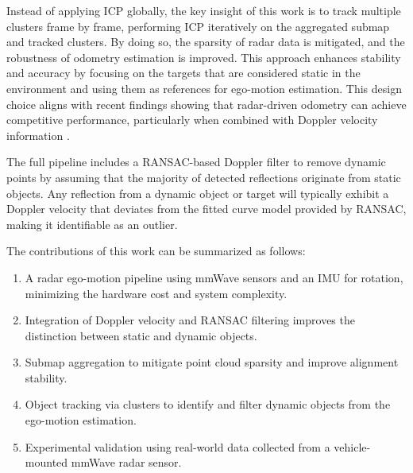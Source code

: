 Instead of applying ICP globally, the key insight of this work is to track multiple clusters frame by frame, performing ICP iteratively on the aggregated submap and tracked clusters.
By doing so, the sparsity of radar data is mitigated, and the robustness of odometry estimation is improved.
This approach enhances stability and accuracy by focusing on the targets that are considered static in the environment and using them as references for ego-motion estimation.
This design choice aligns with recent findings showing that radar-driven odometry can achieve competitive performance, particularly when combined with Doppler velocity information \cite{EgoMotion_DopplerRadar, HighSpeed_Estimation}.

The full pipeline includes a RANSAC-based Doppler filter to remove dynamic points by assuming that the majority of detected reflections originate from static objects.
Any reflection from a dynamic object or target will typically exhibit a Doppler velocity that deviates from the fitted curve model provided by RANSAC, making it identifiable as an outlier.

The contributions of this work can be summarized as follows:  
\begin{enumerate}
    \item A radar ego-motion pipeline using mmWave sensors and an IMU for rotation, minimizing the hardware cost and system complexity.
    \item Integration of Doppler velocity and RANSAC filtering improves the distinction between static and dynamic objects.
    \item Submap aggregation to mitigate point cloud sparsity and improve alignment stability.
    \item Object tracking via clusters to identify and filter dynamic objects from the ego-motion estimation.
    \item Experimental validation using real-world data collected from a vehicle-mounted mmWave radar sensor.  
\end{enumerate}



